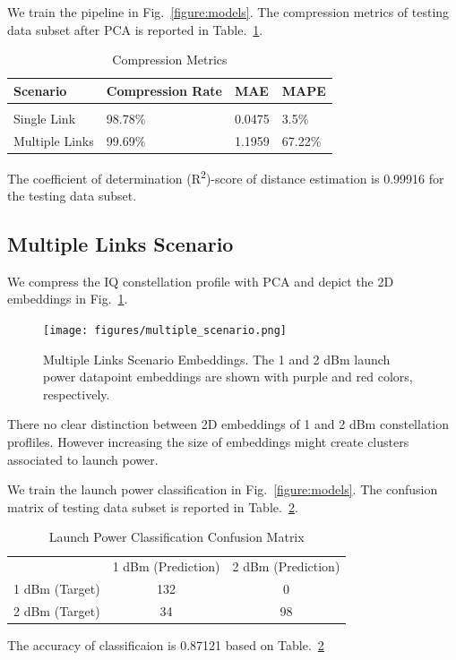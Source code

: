 \documentclass[lettersize,journal, one-column]{IEEEtran}
\begin{document}
We train the pipeline in Fig.~\ref{figure:models}.
The compression metrics of testing data subset after PCA is reported in Table.~\ref{table:compression}.
\begin{table}
    \centering
    \caption{Compression Metrics}
    \begin{tabular}{l l l l}
        \hline
        \hline
        Scenario & Compression Rate & MAE & MAPE \\
		\hline \\
        Single Link & 98.78\% & 0.0475 & 3.5\% \\
        Multiple Links & 99.69\% & 1.1959 & 67.22\% \\
        \hline
    \end{tabular}
    \label{table:compression}
\end{table}

The coefficient of determination (R\textsuperscript{2})-score of distance estimation is 0.99916 for the testing data subset.

\subsection{Multiple Links Scenario}
We compress the IQ constellation profile with PCA and depict the 2D embeddings in Fig.~\ref{figure:multiple_whole}.
\begin{figure}
	\centering
    \texttt{[image: figures/multiple\_scenario.png]}
    \caption{Multiple Links Scenario Embeddings. The 1 and 2 dBm launch power datapoint embeddings are shown with purple and red colors, respectively.}
	\label{figure:multiple_whole}
\end{figure}
There no clear distinction between 2D embeddings of 1 and 2 dBm constellation profliles.
However increasing the size of embeddings might create clusters associated to launch power.

We train the launch power classification in Fig.~\ref{figure:models}.
The confusion matrix of testing data subset is reported in Table.~\ref{table:confusion_mat}.
\begin{table}
    \centering
    \caption{Launch Power Classification Confusion Matrix}
    \begin{tabular}{l l l}
        & 1 dBm (Prediction) & 2 dBm (Prediction) \\
        \cline{2-3}
        1 dBm (Target) & \multicolumn{1}{|c|}{132} & \multicolumn{1}{c|}{0} \\
        \cline{2-3}
        2 dBm (Target) & \multicolumn{1}{|c|}{34} & \multicolumn{1}{c|}{98} \\
        \cline{2-3}
    \end{tabular}
    \label{table:confusion_mat}
\end{table}
The accuracy of classificaion is 0.87121 based on Table.~\ref{table:confusion_mat}
\end{document}
